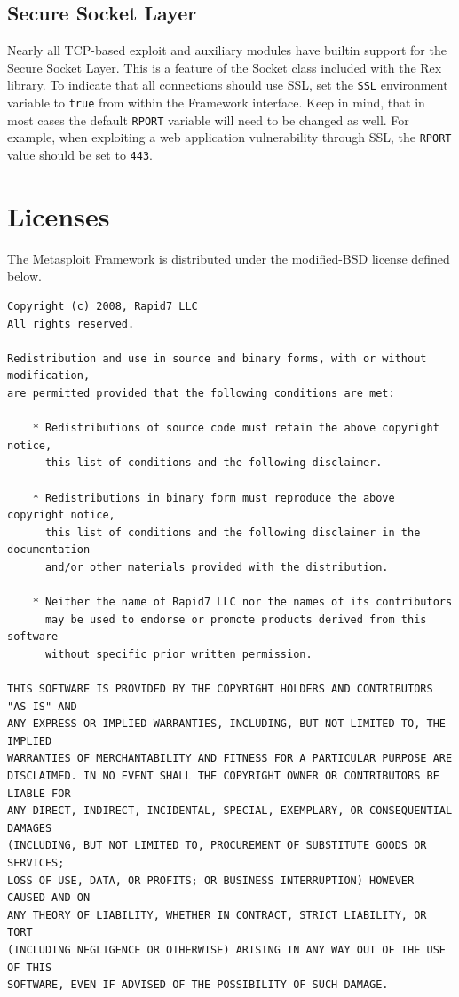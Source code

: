 \documentclass{report}
\begin{document}
	\section{Secure Socket Layer}
	\label{REF-SSL}
\par
Nearly all TCP-based exploit and auxiliary modules have builtin support for the Secure Socket Layer.
This is a feature of the Socket class included with the Rex library. To indicate that all connections
should use SSL, set the \texttt{SSL} environment variable to \texttt{true} from within the Framework
interface. Keep in mind, that in most cases the default \texttt{RPORT} variable will need to be
changed as well. For example, when exploiting a web application vulnerability through SSL, the
\texttt{RPORT} value should be set to \texttt{443}.

\pagebreak
\chapter{Licenses}

\par
The Metasploit Framework is distributed under the modified-BSD license defined below.

{\footnotesize
\begin{verbatim}
Copyright (c) 2008, Rapid7 LLC
All rights reserved.

Redistribution and use in source and binary forms, with or without modification,
are permitted provided that the following conditions are met:

    * Redistributions of source code must retain the above copyright notice,
	  this list of conditions and the following disclaimer.

    * Redistributions in binary form must reproduce the above copyright notice,
	  this list of conditions and the following disclaimer in the documentation
	  and/or other materials provided with the distribution.

    * Neither the name of Rapid7 LLC nor the names of its contributors
	  may be used to endorse or promote products derived from this software
	  without specific prior written permission.

THIS SOFTWARE IS PROVIDED BY THE COPYRIGHT HOLDERS AND CONTRIBUTORS "AS IS" AND
ANY EXPRESS OR IMPLIED WARRANTIES, INCLUDING, BUT NOT LIMITED TO, THE IMPLIED
WARRANTIES OF MERCHANTABILITY AND FITNESS FOR A PARTICULAR PURPOSE ARE
DISCLAIMED. IN NO EVENT SHALL THE COPYRIGHT OWNER OR CONTRIBUTORS BE LIABLE FOR
ANY DIRECT, INDIRECT, INCIDENTAL, SPECIAL, EXEMPLARY, OR CONSEQUENTIAL DAMAGES
(INCLUDING, BUT NOT LIMITED TO, PROCUREMENT OF SUBSTITUTE GOODS OR SERVICES;
LOSS OF USE, DATA, OR PROFITS; OR BUSINESS INTERRUPTION) HOWEVER CAUSED AND ON
ANY THEORY OF LIABILITY, WHETHER IN CONTRACT, STRICT LIABILITY, OR TORT
(INCLUDING NEGLIGENCE OR OTHERWISE) ARISING IN ANY WAY OUT OF THE USE OF THIS
SOFTWARE, EVEN IF ADVISED OF THE POSSIBILITY OF SUCH DAMAGE.
\end{verbatim}}
\end{document}
